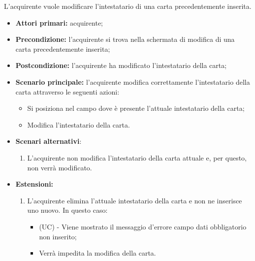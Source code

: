 L'acquirente vuole modificare l'intestatario di una carta precedentemente inserita.
\begin{itemize}
    \item \textbf{Attori primari:} acquirente;
    \item \textbf{Precondizione:} l'acquirente si trova nella schermata di modifica di una carta precedentemente inserita;
    \item \textbf{Postcondizione:} l'acquirente ha modificato l'intestatario della carta;
    \item \textbf{Scenario principale:} l'acquirente modifica correttamente l'intestatario della carta attraverso le seguenti azioni:
    \begin{itemize}
        \item Si posiziona nel campo dove è presente l'attuale intestatario della carta;
        \item Modifica l'intestatario della carta.
    \end{itemize}
    \item \textbf{Scenari alternativi}:
    \begin{enumerate}[label=\lett]
        \item L'acquirente non modifica l'intestatario della carta attuale e, per questo, non verrà modificato.
    \end{enumerate}
    \item \textbf{Estensioni:}
    \begin{enumerate}[label=\lett]
        \item L'acquirente elimina l'attuale intestatario della carta e non ne inserisce uno nuovo. In questo caso:
        \begin{itemize}
            \item (UC) - Viene mostrato il messaggio d'errore campo dati obbligatorio non inserito;
            \item Verrà impedita la modifica della carta.
        \end{itemize}
    \end{enumerate}
\end{itemize}

